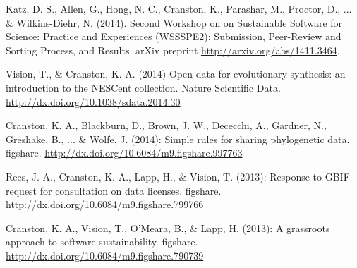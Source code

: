 \documentclass[10pt]{article}
\begin{document}
Katz, D. S., Allen, G., Hong, N. C., Cranston, K., Parashar, M., Proctor, D., ... \& Wilkins-Diehr, N. (2014). Second Workshop on on Sustainable Software for Science: Practice and Experiences (WSSSPE2): Submission, Peer-Review and Sorting Process, and Results. arXiv preprint \url{http://arxiv.org/abs/1411.3464}.

Vision, T., \& Cranston, K. A. (2014) Open data for evolutionary synthesis: an introduction to the NESCent collection. Nature Scientific Data. \url{http://dx.doi.org/10.1038/sdata.2014.30} 

Cranston, K. A., Blackburn, D., Brown, J. W., Dececchi, A., Gardner, N., Greshake, B., ... \& Wolfe, J. (2014): Simple rules for sharing phylogenetic data. figshare. \url{http://dx.doi.org/10.6084/m9.figshare.997763} 

Rees, J. A., Cranston, K. A., Lapp, H., \& Vision, T. (2013): Response to GBIF request for consultation on data licenses. figshare. \url{http://dx.doi.org/10.6084/m9.figshare.799766} 

Cranston, K. A., Vision, T., O'Meara, B., \& Lapp, H. (2013): A grassroots approach to software sustainability. figshare.
\url{http://dx.doi.org/10.6084/m9.figshare.790739} 

\end{document}
